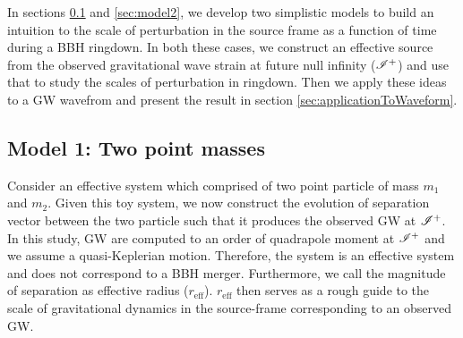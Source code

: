In sections \ref{sec:model1} and \ref{sec:model2}, we develop two simplistic models to build an intuition to the scale of perturbation in the source frame as a function of time during a BBH ringdown. In both these cases, we construct an effective source from the observed gravitational wave strain at future null infinity ($\mathscr{I^+}$) and use that to study the scales of perturbation in ringdown. Then we apply these ideas to a GW wavefrom and present the result in section \ref{sec:applicationToWaveform}.
 
\subsection{Model 1: Two point masses }
\label{sec:model1}

Consider an effective system which comprised of two point particle of mass $m_{1}$ and $m_{2}$. Given this toy system, we now construct the evolution of separation vector between the two particle such that it produces the observed GW at $\mathscr{I^+}$. In this study, GW are computed to an order of quadrapole moment at $\mathscr{I^+}$ and we assume a quasi-Keplerian motion. Therefore, the system is an effective system and does not correspond to a BBH merger. Furthermore, we call the magnitude of separation as effective radius ($r_{\mathrm{eff}}$). $r_{\mathrm{eff}}$ then serves as a rough guide to the scale of gravitational dynamics in the source-frame  corresponding to an observed GW. 

